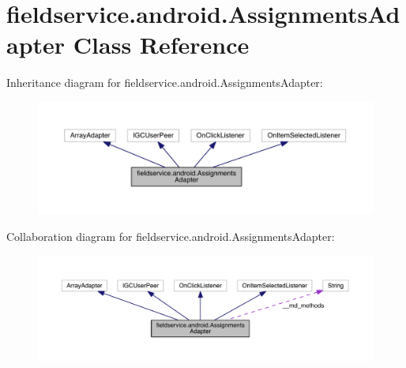 \hypertarget{classfieldservice_1_1android_1_1_assignments_adapter}{\section{fieldservice.\+android.\+Assignments\+Adapter Class Reference}
\label{classfieldservice_1_1android_1_1_assignments_adapter}
}


Inheritance diagram for fieldservice.\+android.\+Assignments\+Adapter\+:
\nopagebreak
\begin{figure}[H]
\begin{center}
\leavevmode
\includegraphics[width=350pt]{classfieldservice_1_1android_1_1_assignments_adapter__inherit__graph}
\end{center}
\end{figure}


Collaboration diagram for fieldservice.\+android.\+Assignments\+Adapter\+:
\nopagebreak
\begin{figure}[H]
\begin{center}
\leavevmode
\includegraphics[width=350pt]{classfieldservice_1_1android_1_1_assignments_adapter__coll__graph}
\end{center}
\end{figure}

